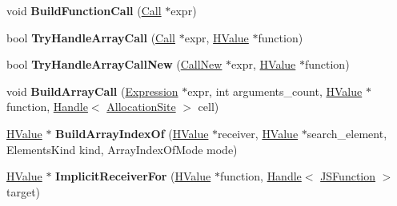 \begin{DoxyCompactItemize}
\item 
void {\bfseries Build\+Function\+Call} (\hyperlink{classv8_1_1internal_1_1_call}{Call} $\ast$expr)\hypertarget{classv8_1_1internal_1_1_h_optimized_graph_builder_a53629e58b2460ac2286ab85f73f62c57}{}\label{classv8_1_1internal_1_1_h_optimized_graph_builder_a53629e58b2460ac2286ab85f73f62c57}

\item 
bool {\bfseries Try\+Handle\+Array\+Call} (\hyperlink{classv8_1_1internal_1_1_call}{Call} $\ast$expr, \hyperlink{classv8_1_1internal_1_1_h_value}{H\+Value} $\ast$function)\hypertarget{classv8_1_1internal_1_1_h_optimized_graph_builder_a6f7b8fa07c0abc83f394fe10dfc5b65d}{}\label{classv8_1_1internal_1_1_h_optimized_graph_builder_a6f7b8fa07c0abc83f394fe10dfc5b65d}

\item 
bool {\bfseries Try\+Handle\+Array\+Call\+New} (\hyperlink{classv8_1_1internal_1_1_call_new}{Call\+New} $\ast$expr, \hyperlink{classv8_1_1internal_1_1_h_value}{H\+Value} $\ast$function)\hypertarget{classv8_1_1internal_1_1_h_optimized_graph_builder_a926102c8d6ebca0d6dd055e01a2d6210}{}\label{classv8_1_1internal_1_1_h_optimized_graph_builder_a926102c8d6ebca0d6dd055e01a2d6210}

\item 
void {\bfseries Build\+Array\+Call} (\hyperlink{classv8_1_1internal_1_1_expression}{Expression} $\ast$expr, int arguments\+\_\+count, \hyperlink{classv8_1_1internal_1_1_h_value}{H\+Value} $\ast$function, \hyperlink{classv8_1_1internal_1_1_handle}{Handle}$<$ \hyperlink{classv8_1_1internal_1_1_allocation_site}{Allocation\+Site} $>$ cell)\hypertarget{classv8_1_1internal_1_1_h_optimized_graph_builder_a53761d90b3f8cfd1e543bba9905eebc1}{}\label{classv8_1_1internal_1_1_h_optimized_graph_builder_a53761d90b3f8cfd1e543bba9905eebc1}

\item 
\hyperlink{classv8_1_1internal_1_1_h_value}{H\+Value} $\ast$ {\bfseries Build\+Array\+Index\+Of} (\hyperlink{classv8_1_1internal_1_1_h_value}{H\+Value} $\ast$receiver, \hyperlink{classv8_1_1internal_1_1_h_value}{H\+Value} $\ast$search\+\_\+element, Elements\+Kind kind, Array\+Index\+Of\+Mode mode)\hypertarget{classv8_1_1internal_1_1_h_optimized_graph_builder_a2e9203b1a7d66db5fc2dd5ef16d3cb34}{}\label{classv8_1_1internal_1_1_h_optimized_graph_builder_a2e9203b1a7d66db5fc2dd5ef16d3cb34}

\item 
\hyperlink{classv8_1_1internal_1_1_h_value}{H\+Value} $\ast$ {\bfseries Implicit\+Receiver\+For} (\hyperlink{classv8_1_1internal_1_1_h_value}{H\+Value} $\ast$function, \hyperlink{classv8_1_1internal_1_1_handle}{Handle}$<$ \hyperlink{classv8_1_1internal_1_1_j_s_function}{J\+S\+Function} $>$ target)\hypertarget{classv8_1_1internal_1_1_h_optimized_graph_builder_a73a533b3d269319dc83099bf91b8078f}{}\label{classv8_1_1internal_1_1_h_optimized_graph_builder_a73a533b3d269319dc83099bf91b8078f}


\end{DoxyCompactItemize}
